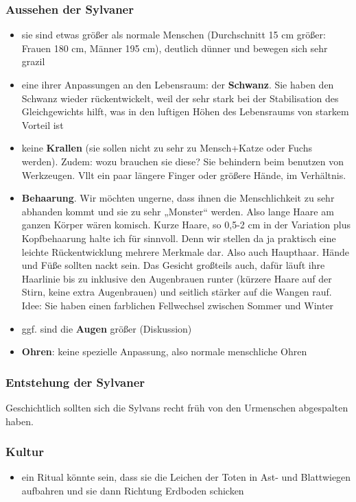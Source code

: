 \subsubsection{Aussehen der Sylvaner}
\begin{itemize}
	\item sie sind etwas größer als normale Menschen (Durchschnitt 15 cm größer: Frauen 180 cm, Männer 195 cm), deutlich dünner und bewegen sich sehr grazil
	\item eine ihrer Anpassungen an den Lebensraum: der \textbf{Schwanz}. Sie haben den Schwanz wieder rückentwickelt, weil der sehr stark bei der Stabilisation des Gleichgewichts hilft, was in den luftigen Höhen des Lebensraums von starkem Vorteil ist
	\item keine \textbf{Krallen} (sie sollen nicht zu sehr zu Mensch+Katze oder Fuchs werden). Zudem: wozu brauchen sie diese? Sie behindern beim benutzen von Werkzeugen. Vllt ein paar längere Finger oder größere Hände, im Verhältnis. 
	\item \textbf{Behaarung}. Wir möchten ungerne, dass ihnen die Menschlichkeit zu sehr abhanden kommt und sie zu sehr „Monster“ werden. Also lange Haare am ganzen Körper wären komisch. Kurze Haare, so 0,5-2 cm in der Variation plus Kopfbehaarung halte ich für sinnvoll. Denn wir stellen da ja praktisch eine leichte Rückentwicklung mehrere Merkmale dar. Also auch Haupthaar. Hände und Füße sollten nackt sein. Das Gesicht großteils auch, dafür läuft ihre Haarlinie bis zu inklusive den Augenbrauen runter (kürzere Haare auf der Stirn, keine extra Augenbrauen) und seitlich stärker auf die Wangen rauf.\\
	Idee: Sie haben einen farblichen Fellwechsel zwischen Sommer und Winter
	\item ggf. sind die \textbf{Augen} größer (Diskussion)
	\item \textbf{Ohren}: keine spezielle Anpassung, also normale menschliche Ohren
\end{itemize}

\subsubsection{Entstehung der Sylvaner}
Geschichtlich sollten sich die Sylvans recht früh von den Urmenschen abgespalten haben.

\subsubsection{Kultur}
\begin{itemize}
	\item ein Ritual könnte sein, dass sie die Leichen der Toten in Ast- und Blattwiegen aufbahren und sie dann  Richtung Erdboden schicken
\end{itemize}

